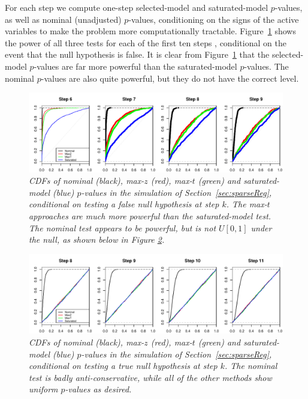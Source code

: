 \documentclass{article}
\begin{document}
For each step we compute one-step selected-model and saturated-model $p$-values, as well as nominal (unadjusted) $p$-values, conditioning on the signs of the active variables to make the problem more computationally tractable. Figure~\ref{fig:simulation_null_false} shows the power of all three tests for each of the first ten steps , conditional on the event that the null hypothesis is false. It is clear from Figure~\ref{fig:simulation_null_false} that the selected-model $p$-values are far more powerful than the saturated-model $p$-values. The nominal $p$-values are also quite powerful, but they do not have the correct level.

\begin{figure}[h]
  \centering
  \includegraphics[width=1\textwidth]{figs/simulation_snr_5_alpha_05_null_false.pdf}
  \caption{\em  CDFs of nominal (black), max-$z$ (red), max-$t$ (green) and  saturated-model (blue) $p$-values in the simulation of Section~\ref{sec:sparseReg}, conditional on testing a false null hypothesis at step $k$. The max-$t$ approaches are much more powerful than the saturated-model test. The nominal test appears to be powerful, 
  but is not $U[0,1]$ under the null, as shown below in Figure \ref{fig:simulation_null_true}.}
  \label{fig:simulation_null_false}
\end{figure}

\begin{figure}[h]
  \centering
  \includegraphics[width=1\textwidth]{figs/simulation_snr_5_alpha_05_null_true.pdf}
  \caption{\em  CDFs of nominal (black), max-$z$ (red), max-$t$ (green) and  saturated-model (blue) $p$-values in the simulation of Section~\ref{sec:sparseReg}, conditional on testing a true null hypothesis at step $k$.  The nominal test is badly anti-conservative, while all of the other methods  show uniform $p$-values as desired.}
  \label{fig:simulation_null_true}
\end{figure}
\end{document}
